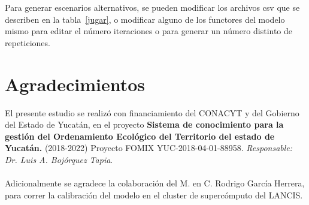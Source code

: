 \documentclass[12pt,a4paper,oldfontcommands]{article}
\begin{document}
\bigskip
Para generar escenarios alternativos, se pueden modificar los archivos csv que se describen en la tabla~\ref{jugar}, o modificar alguno de los functores del modelo mismo para editar el número iteraciones o para generar un número distinto de repeticiones. \\
 
\pagebreak
\linebreak
\newpage
\section*{Agradecimientos}
El presente estudio se realizó con financiamiento del CONACYT y del Gobierno del Estado de Yucatán, en el proyecto \textbf{Sistema de conocimiento para la gestión del Ordenamiento Ecológico del Territorio del estado de Yucatán.} (2018-2022) Proyecto FOMIX YUC-2018-04-01-88958. \textit{Responsable: Dr. Luis A. Bojórquez Tapia}. \\
\bigskip \\
Adicionalmente se agradece la colaboración del M. en C. Rodrigo García Herrera, para correr la calibración del modelo en el cluster de supercómputo del LANCIS.
 \\
\bigskip


\printbibliography
\end{document}
